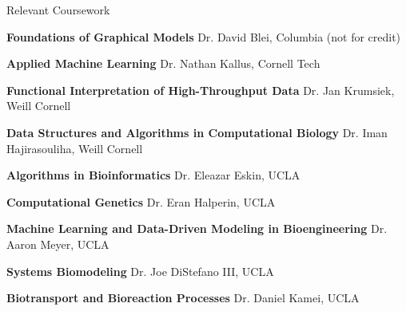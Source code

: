 \documentclass{resume} %
\begin{document}
\begin{rSection}{Relevant Coursework}

\item \textbf{Foundations of Graphical Models} \newline
Dr. David Blei, Columbia (not for credit)

\item \textbf{Applied Machine Learning} \newline
Dr. Nathan Kallus, Cornell Tech

\item \textbf{Functional Interpretation of High-Throughput Data} \newline
Dr. Jan Krumsiek, Weill Cornell

\item \textbf{Data Structures and Algorithms in Computational Biology} \newline
Dr. Iman Hajirasouliha, Weill Cornell

\item \textbf{Algorithms in Bioinformatics} \newline
Dr. Eleazar Eskin, UCLA

\item \textbf{Computational Genetics} \newline
Dr. Eran Halperin, UCLA

\item \textbf{Machine Learning and Data-Driven Modeling in Bioengineering} \newline
Dr. Aaron Meyer, UCLA

\item \textbf{Systems Biomodeling} \newline
Dr. Joe DiStefano III, UCLA

\item \textbf{Biotransport and Bioreaction Processes} \newline
Dr. Daniel Kamei, UCLA

\end{rSection}
\end{document}
